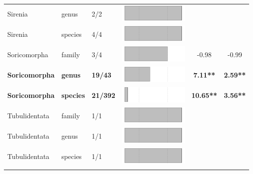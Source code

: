 \begin{longtable}{lL{1.8cm}C{2cm}lcc}
  Sirenia & genus & 2/2 & \includegraphics[width=0.20\linewidth, height=0.05\linewidth]{Table_figures/bar77.pdf} &   &   \\ 
  Sirenia & species & 4/4 & \includegraphics[width=0.20\linewidth, height=0.05\linewidth]{Table_figures/bar78.pdf} &   &   \\ 
  Soricomorpha & family & 3/4 & \includegraphics[width=0.20\linewidth, height=0.05\linewidth]{Table_figures/bar79.pdf} & -0.98 & -0.99 \\ 
  \textbf{Soricomorpha} & \textbf{genus} & \textbf{19/43} & \includegraphics[width=0.20\linewidth, height=0.05\linewidth]{Table_figures/bar80.pdf} & \textbf{7.11**} & \textbf{2.59**} \\ 
  \textbf{Soricomorpha} & \textbf{species} & \textbf{21/392} & \includegraphics[width=0.20\linewidth, height=0.05\linewidth]{Table_figures/bar81.pdf} & \textbf{10.65**} & \textbf{3.56**} \\ 
  Tubulidentata & family & 1/1 & \includegraphics[width=0.20\linewidth, height=0.05\linewidth]{Table_figures/bar82.pdf} &   &   \\ 
  Tubulidentata & genus & 1/1 & \includegraphics[width=0.20\linewidth, height=0.05\linewidth]{Table_figures/bar83.pdf} &   &   \\ 
  Tubulidentata & species & 1/1 & \includegraphics[width=0.20\linewidth, height=0.05\linewidth]{Table_figures/bar84.pdf} &   &   \\ 
   \hline
\hline
\label{Table_results}
\end{longtable}
